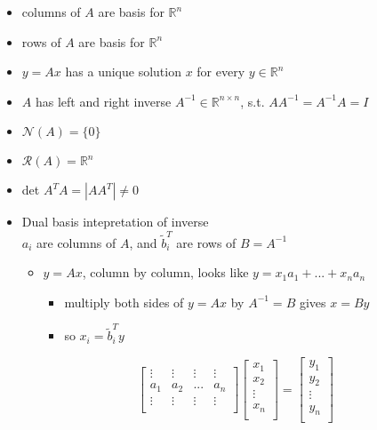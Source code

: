 \documentclass[10pt,letterpaper]{article}
\begin{document}
\begin{itemize}
\begin{itemize}
\begin{itemize}
\item columns of $A$ are basis for $\mathbb{R}^n$
\item rows of $A$ are basis for $\mathbb{R}^n$
\item $y=Ax$ has a unique solution $x$ for every $y \in \mathbb{R}^n$
\item $A$ has left and right inverse $A^{-1} \in \mathbb{R}^{n\times n}$, s.t. $AA^{-1}=A^{-1}A=I$
\item $\mathcal{N}(A)= \{0\}$
\item $\mathcal{R}(A)=\mathbb{R}^n$
\item det $A^T A= |AA^T| \ne 0$
\end{itemize}

\end{itemize}
\begin{itemize}

\item Dual basis intepretation of inverse\\
\label{sec-2_2_4_3_1}%
$a_i$ are columns of $A$, and $\tilde b_i^T$ are rows of $B=A^{-1}$
\begin{itemize}
\item $y=Ax$, column by column, looks like $y=x_1 a_1 + ... + x_n a_n$

\begin{itemize}
\item multiply both sides of $y=Ax$ by $A^{-1}=B$ gives $x=By$
\item so $x_i=\tilde b_i^T y$
\end{itemize}

\end{itemize}

\[
\begin{bmatrix}
  \vdots & \vdots & \vdots & \vdots \\
  a_1    & a_2    & ...    & a_n    \\
  \vdots & \vdots & \vdots & \vdots \\
\end{bmatrix}
\begin{bmatrix}
  x_1      \\
  x_2      \\
  \vdots   \\
  x_n      \\
\end{bmatrix}
=
\begin{bmatrix}
  y_1      \\
  y_2      \\
  \vdots   \\
  y_n      \\
\end{bmatrix}
\]


\end{itemize}
\end{itemize}
\end{document}
